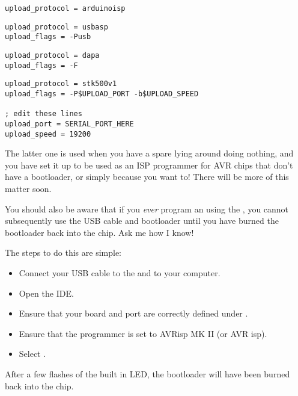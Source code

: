 \begin{lstlisting}[caption={The \inline{platformio.ini} additions for `ArduinoISP` Programmer}]
upload_protocol = arduinoisp
\end{lstlisting}


\begin{lstlisting}[caption={The \inline{platformio.ini} additions for `USBasp' ISP Programmer}]
upload_protocol = usbasp
upload_flags = -Pusb
\end{lstlisting}


\begin{lstlisting}[caption={The \inline{platformio.ini} additions for `Parallel Port' ISP Programmer}]
upload_protocol = dapa
upload_flags = -F
\end{lstlisting}


\begin{lstlisting}[caption={The \inline{platformio.ini} additions for `Arduino as ISP` Programmer}]
upload_protocol = stk500v1
upload_flags = -P$UPLOAD_PORT -b$UPLOAD_SPEED

; edit these lines
upload_port = SERIAL_PORT_HERE
upload_speed = 19200
\end{lstlisting}

The latter one is used when you have a spare   lying around doing nothing, and you have set it up to be used as an ISP programmer for AVR chips that don't have a bootloader, or simply because you want to! There will be more of this matter soon.

\begin{warning}
You should also be aware that if you \emph{ever} program an   using the , you cannot subsequently use the USB cable and bootloader until you have burned the bootloader back into the chip. Ask me how I know! 

The steps to do this are simple:

\begin{itemize}
\item Connect your USB cable to the   and to your computer.
\item Open the   IDE.
\item Ensure that your board and port are correctly defined under .
\item Ensure that the programmer is set to AVRisp MK II (or AVR isp).
\item Select .
\end{itemize}

After a few flashes of the built in LED, the bootloader will have been burned back into the chip. 
\end{warning}


